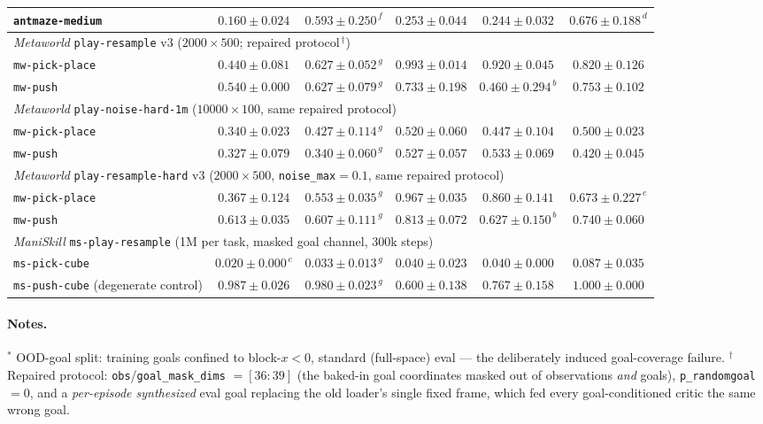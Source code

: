 \documentclass[10pt]{article}
\begin{document}
\begin{table}[h]
{\begin{tabular}{l ccccc}
\texttt{antmaze-medium}& $0.160\pm0.024$ & $0.593\pm0.250^{\,f}$ & $0.253\pm0.044$          & $0.244\pm0.032$          & $0.676\pm0.188^{\,d}$ \\
\midrule
\multicolumn{6}{l}{\emph{Metaworld} \texttt{play-resample} v3 ($2000\times500$; repaired protocol$^{\,\dagger}$)}\\
\texttt{mw-pick-place} & $0.440\pm0.081$ & $0.627\pm0.052^{\,g}$ & $\mathbf{0.993\pm0.014}$ & $0.920\pm0.045$          & $0.820\pm0.126$ \\
\texttt{mw-push}       & $0.540\pm0.000$ & $0.627\pm0.079^{\,g}$ & $0.733\pm0.198$          & $0.460\pm0.294^{\,b}$    & $0.753\pm0.102$ \\
\midrule
\multicolumn{6}{l}{\emph{Metaworld} \texttt{play-noise-hard-1m} ($10000\times100$, same repaired protocol)}\\
\texttt{mw-pick-place} & $0.340\pm0.023$ & $0.427\pm0.114^{\,g}$ & $0.520\pm0.060$          & $0.447\pm0.104$          & $0.500\pm0.023$ \\
\texttt{mw-push}       & $0.327\pm0.079$ & $0.340\pm0.060^{\,g}$ & $0.527\pm0.057$          & $0.533\pm0.069$          & $0.420\pm0.045$ \\
\midrule
\multicolumn{6}{l}{\emph{Metaworld} \texttt{play-resample-hard} v3 ($2000\times500$, \texttt{noise\_max}$=0.1$, same repaired protocol)}\\
\texttt{mw-pick-place} & $0.367\pm0.124$ & $0.553\pm0.035^{\,g}$ & $\mathbf{0.967\pm0.035}$ & $0.860\pm0.141$          & $0.673\pm0.227^{\,e}$ \\
\texttt{mw-push}       & $0.613\pm0.035$ & $0.607\pm0.111^{\,g}$ & $0.813\pm0.072$          & $0.627\pm0.150^{\,b}$    & $0.740\pm0.060$ \\
\midrule
\multicolumn{6}{l}{\emph{ManiSkill} \texttt{ms-play-resample} (1M per task, masked goal channel, 300k steps)}\\
\texttt{ms-pick-cube}  & $0.020\pm0.000^{\,c}$ & $0.033\pm0.013^{\,g}$ & $0.040\pm0.023$    & $0.040\pm0.000$          & $\mathbf{0.087\pm0.035}$ \\
\texttt{ms-push-cube} (degenerate control)
                       & $0.987\pm0.026$ & $0.980\pm0.023^{\,g}$ & $0.600\pm0.138$          & $0.767\pm0.158$          & $1.000\pm0.000$ \\
\bottomrule
\end{tabular}}
\end{table}

\paragraph{Notes.}
$^{\ast}$ OOD-goal split: training goals confined to block-$x<0$, standard (full-space)
eval --- the deliberately induced goal-coverage failure. $^{\dagger}$ Repaired protocol:
\texttt{obs}/\texttt{goal\_mask\_dims} $=[36{:}39]$ (the baked-in goal coordinates masked
out of observations \emph{and} goals), \texttt{p\_randomgoal}$=0$, and a \emph{per-episode
synthesized} eval goal replacing the old loader's single fixed frame, which fed every
goal-conditioned critic the same wrong goal.
\end{document}
